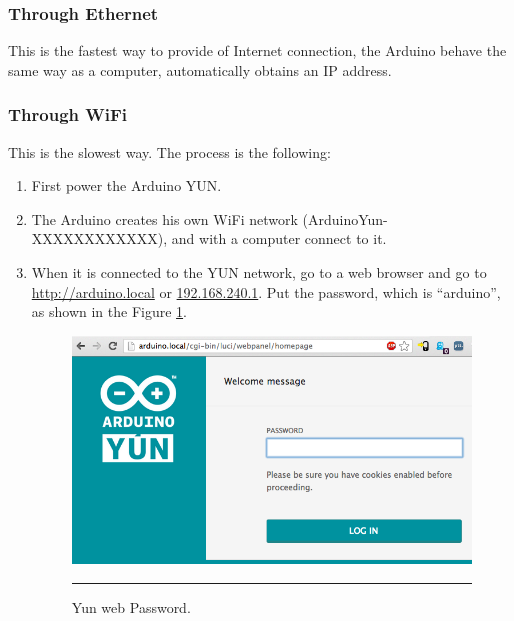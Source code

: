 \documentclass[12pt, a4paper,twoside]{tesi_upf}
\begin{document}
    \subsubsection{Through Ethernet}
      This is the fastest way to provide of Internet connection, the Arduino behave the same way as a computer, automatically obtains an IP address.
      
    \subsubsection{Through WiFi}
      This is the slowest way. The process is the following:
      \begin{enumerate}
        \item First power the Arduino YUN. 
        \item The Arduino creates his own WiFi network (ArduinoYun-XXXXXXXXXXXX), and with a computer connect to it.
        \item When it is connected to the YUN network, go to a web browser and go to \url{http://arduino.local} or \url{192.168.240.1}. Put the password, which is ``arduino'', as shown in the Figure \ref{fig:YunWebPassword}.
          \begin{figure}[htbp]
            \centering
                \includegraphics[scale=0.3]{./Figures/YunWebPassword.png}
                \rule{18em}{0.5pt}
            \caption[Yun web Password]{Yun web Password.}
            \label{fig:YunWebPassword}
          \end{figure}
        

\end{enumerate}
\end{document}
